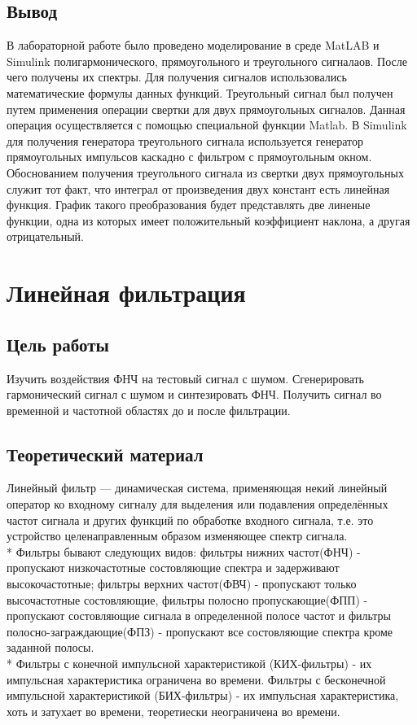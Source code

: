 \documentclass[10pt,a4paper]{article}
\begin{document}
\subsection{Вывод}
В лабораторной работе было проведено моделирование в среде MatLAB и Simulink полигармонического, прямоугольного и треугольного сигналаов. После чего получены их спектры. Для получения сигналов использовались математические формулы данных функций. Треугольный сигнал был получен путем применения операции свертки для двух прямоугольных сигналов. Данная операция осуществляется с помощью специальной функции Matlab. В Simulink для получения генератора треугольного сигнала используется генератор прямоугольных импульсов каскадно с фильтром с прямоугольным окном.\newline
Обоснованием получения треугольного сигнала из свертки двух прямоугольных служит тот факт, что интеграл от произведения двух констант есть линейная функция. График такого преобразования будет представлять две линеные функции, одна из которых имеет положительный коэффициент наклона, а другая отрицательный.

\section{Линейная фильтрация}
\subsection{Цель работы}
Изучить воздействия ФНЧ на тестовый сигнал с шумом. Сгенерировать гармонический сигнал с шумом и синтезировать ФНЧ. Получить сигнал во временной и частотной областях до и после фильтрации.
\subsection{Теоретический материал}
Линейный фильтр — динамическая система, применяющая некий линейный оператор ко входному сигналу для выделения или подавления определённых частот сигнала и других функций по обработке входного сигнала, т.е. это устройство целенаправленным образом изменяющее спектр сигнала.\\*
Фильтры бывают следующих видов: фильтры нижних частот(ФНЧ) -  пропускают низкочастотные состовляющие спектра и задерживают высокочастотные; фильтры верхних частот(ФВЧ) -  пропускают только высочастотные состовляющие, фильтры полосно пропускающие(ФПП)  - пропускают состовляющие сигнала в определенной полосе частот и фильтры полосно-заграждающие(ФПЗ) - пропускают все состовляющие спектра кроме заданной полосы.\\*
Фильтры с конечной импульсной характеристикой (КИХ-фильтры) - их импульсная характеристика ограничена во времени. Фильтры с бесконечной импульсной характеристикой (БИХ-фильтры) - их импульсная характеристика, хоть и затухает во времени, теоретиески неограничена во времени.
\end{document}
